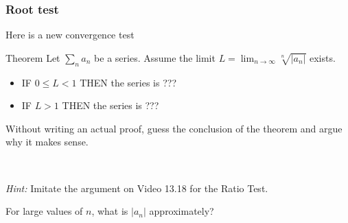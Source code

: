 \documentclass[14pt]{beamer}
\newcommand {\DS} [1] {${\displaystyle #1}$}
\newcommand{\setsize}[1]{\fontsize{#1}{#1}\selectfont} %
\newcommand{\smallerfont}{\setsize{13}} %
\begin{document}
\begin{frame}[t]
\smallerfont
\frametitle{Root test}

Here is a new convergence test
\begin{block}{Theorem}
Let \DS{\sum_{n} a_n} be a series.  Assume the limit \DS{L= \lim_{n \to \infty} \sqrt[n]{|a_n|}} exists.
	\begin{itemize}
		\item IF $0 \leq L <1$  THEN the series is ???
		\item IF $L > 1$  THEN the series is ???
	\end{itemize}
\end{block}

Without writing an actual proof, guess the conclusion of the theorem and argue why it makes sense.

\

\emph{Hint:}  Imitate the argument on Video 13.18 for the Ratio Test.

	For large values of $n$, what is $|a_n|$ approximately?

\end{frame}
\end{document}
